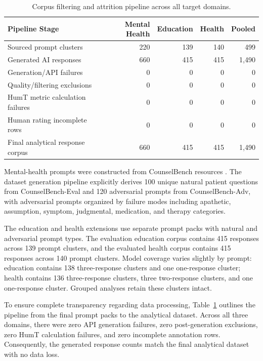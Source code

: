\documentclass[manuscript,review,anonymous]{acmart}
\begin{document}
\begin{table}[t]
\centering
\small
\caption{Corpus filtering and attrition pipeline across all target domains.}
\label{tab:attrition}
\begin{tabular}{lrrrr}
\toprule
Pipeline Stage & Mental Health & Education & Health & Pooled \\
\midrule
Sourced prompt clusters & 220 & 139 & 140 & 499 \\
Generated AI responses & 660 & 415 & 415 & 1,490 \\
Generation/API failures & 0 & 0 & 0 & 0 \\
Quality/filtering exclusions & 0 & 0 & 0 & 0 \\
HumT metric calculation failures & 0 & 0 & 0 & 0 \\
Human rating incomplete rows & 0 & 0 & 0 & 0 \\
\midrule
Final analytical response corpus & 660 & 415 & 415 & 1,490 \\
\bottomrule
\end{tabular}
\end{table}

Mental-health prompts were constructed from CounselBench resources \cite{CounselBench2025}. The dataset generation pipeline explicitly derives 100 unique natural patient questions from CounselBench-Eval and 120 adversarial prompts from CounselBench-Adv, with adversarial prompts organized by failure modes including apathetic, assumption, symptom, judgmental, medication, and therapy categories.

The education and health extensions use separate prompt packs with natural and adversarial prompt types. The evaluation education corpus contains 415 responses across 139 prompt clusters, and the evaluated health corpus contains 415 responses across 140 prompt clusters. Model coverage varies slightly by prompt: education contains 138 three-response clusters and one one-response cluster; health contains 136 three-response clusters, three two-response clusters, and one one-response cluster. Grouped analyses retain these clusters intact.

To ensure complete transparency regarding data processing, Table~\ref{tab:attrition} outlines the pipeline from the final prompt packs to the analytical dataset. Across all three domains, there were zero API generation failures, zero post-generation exclusions, zero HumT calculation failures, and zero incomplete annotation rows. Consequently, the generated response counts match the final analytical dataset with no data loss.
\end{document}
